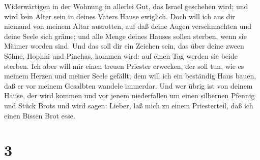 Widerwärtigen in der Wohnung in allerlei Gut, das Israel geschehen wird;
und wird kein Alter sein in deines Vaters Hause ewiglich. 
Doch will ich aus dir niemand von meinem Altar ausrotten, auf daß deine
Augen verschmachten und deine Seele sich gräme; und alle Menge deines
Hauses sollen sterben, wenn sie Männer worden sind.  Und
das soll dir ein Zeichen sein, das über deine zween Söhne, Hophni und
Pinehas, kommen wird: auf einen Tag werden sie beide sterben.
 Ich aber will mir einen treuen Priester erwecken, der soll
tun, wie es meinem Herzen und meiner Seele gefällt; dem will ich ein
beständig Haus bauen, daß er vor meinem Gesalbten wandele immerdar.
 Und wer übrig ist von deinem Hause, der wird kommen und
vor jenem niederfallen um einen silbernen Pfennig und Stück Brots und
wird sagen: Lieber, laß mich zu einem Priesterteil, daß ich einen Bissen
Brot esse.

\hypertarget{section-2}{%
\section{3}\label{section-2}}

